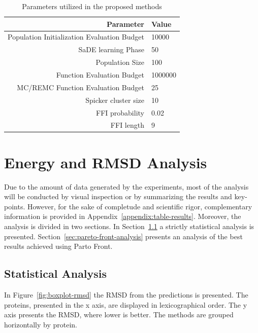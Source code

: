 \begin{table}[ht]
    \centering
    \begin{tabular}{r|l} \hline \hline
        Parameter & Value \\ \hline \hline
        Population Initialization Evaluation Budget & 10000 \\ \hline
        SaDE learning Phase & 50 \\ \hline
        Population Size & 100 \\ \hline
        Function Evaluation Budget & 1000000 \\ \hline
        MC/REMC Function Evaluation Budget & 25 \\ \hline
        Spicker cluster size & 10 \\ \hline
        \ac{FFI} probability & 0.02 \\ \hline
        \ac{FFI} length & 9 \\ \hline \hline
    \end{tabular}
    \caption{Parameters utilized in the proposed methods}
    \label{tab:parameters}
\end{table}

\section{Energy and RMSD Analysis}\label{sec:methods-analysis}

Due to the amount of data generated by the experiments, most of the analysis will
be conducted by visual inspection or by summarizing the results and key-points.
However, for the sake of completude and scientific rigor, complementary
information is provided in Appendix~\ref{appendix:table-results}. Moreover,
the analysis is divided in two sections. In
Section~\ref{sec:statistical-analysis} a strictly statistical analysis is
presented. Section~\ref{sec:pareto-front-analysis} presents an analysis of the
best results achieved using Parto Front.

\subsection{Statistical Analysis}
\label{sec:statistical-analysis}

In Figure~\ref{fig:boxplot-rmsd} the RMSD from the predictions is presented.
The proteins, presented in the x axis, are displayed in lexicographical order.
The y axis presents the RMSD, where lower is better. The methods are grouped
horizontally by protein.

